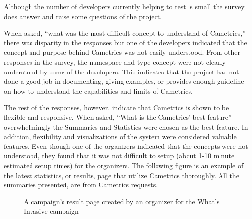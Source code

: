 \documentclass[10pt,a4paper,english]{article}
\begin{document}
Although the number of developers currently helping to test is small the survey does answer and raise some questions of the project.

When asked, ``what was the most difficult concept to understand of Cametrics,'' there was disparity in the responses but one of the developers indicated that the concept and purpose behind Cametrics was not easily understood. From other responses in the survey, the namespace and type concept were not clearly understood by some of the developers. This indicates that the project has not done a good job in documenting, giving examples, or provides enough guideline on how to understand the capabilities and limits of Cametrics.

The rest of the responses, however, indicate that Cametrics is shown to be flexible and responsive. When asked, ``What is the Cametrics' best feature'' overwhelmingly the Summaries and Statistics were chosen as the best feature. In addition, flexibility and visualizations of the system were considered valuable features. Even though one of the organizers indicated that the concepts were not understood, they found that it was not difficult to setup (about 1-10 minute estimated setup times) for the organizers. The following figure is an example of the latest statistics, or results, page that utilize Cametrics thoroughly. All the summaries presented, are from Cametrics requests.
\begin{figure}[htbp]
\centering

\caption{A campaign's result page created by an organizer for the What's Invasive campaign}\end{figure}
\end{document}
